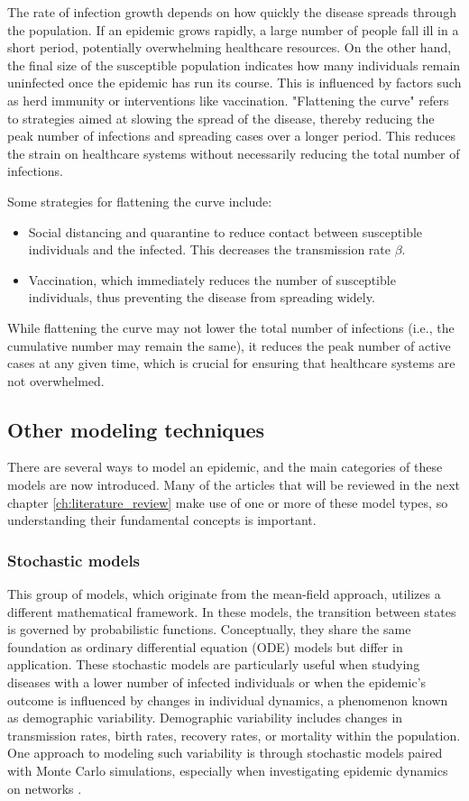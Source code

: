 The rate of infection growth depends on how quickly the disease spreads through the population. If an epidemic grows rapidly, a large number of people fall ill in a short period, potentially overwhelming healthcare resources.
On the other hand, the final size of the susceptible population indicates how many individuals remain uninfected once the epidemic has run its course. This is influenced by factors such as herd immunity or interventions like vaccination.
"Flattening the curve" refers to strategies aimed at slowing the spread of the disease, thereby reducing the peak number of infections and spreading cases over a longer period. This reduces the strain on healthcare systems without necessarily reducing the total number of infections.

Some strategies for flattening the curve include:
\begin{itemize}
	\item Social distancing and quarantine to reduce contact between susceptible individuals and the infected. This decreases the transmission rate $\beta$.
	\item Vaccination, which immediately reduces the number of susceptible individuals, thus preventing the disease from spreading widely.
\end{itemize}
While flattening the curve may not lower the total number of infections (i.e., the cumulative number may remain the same), it reduces the peak number of active cases at any given time, which is crucial for ensuring that healthcare systems are not overwhelmed.


\subsection{Other modeling techniques}
There are several ways to model an epidemic, and the main categories of these models are now introduced. Many of the articles that will be reviewed in the next chapter \ref{ch:literature_review} make use of one or more of these model types, so understanding their fundamental concepts is important.
\subsubsection{Stochastic models} 	
This group of models, which originate from the mean-field approach, utilizes a different mathematical framework. In these models, the transition between states is governed by probabilistic functions. Conceptually, they share the same foundation as ordinary differential equation (ODE) models but differ in application. These stochastic models are particularly useful when studying diseases with a lower number of infected individuals or when the epidemic's outcome is influenced by changes in individual dynamics, a phenomenon known as demographic variability. Demographic variability includes changes in transmission rates, birth rates, recovery rates, or mortality within the population.
One approach to modeling such variability is through stochastic models paired with Monte Carlo simulations, especially when investigating epidemic dynamics on networks \cite{Allen2017}.

